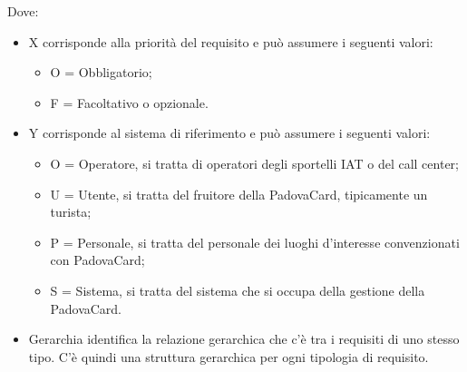 Dove:
\begin{itemize}
\item X corrisponde alla priorità del requisito e può assumere i seguenti valori:
	\begin{itemize}
		\item O = Obbligatorio;
        \item F = Facoltativo o opzionale.
	\end{itemize}
\item Y corrisponde al sistema di riferimento e può assumere i seguenti valori:
	\begin{itemize}
		\item O = Operatore, si tratta di operatori degli sportelli IAT o del call center;
        \item U = Utente, si tratta del fruitore della PadovaCard, tipicamente un turista;
        \item P = Personale, si tratta del personale dei luoghi d'interesse convenzionati con PadovaCard;
        \item S = Sistema, si tratta del sistema che si occupa della gestione della PadovaCard.
	\end{itemize}
\item Gerarchia identifica la relazione gerarchica che c'è tra i requisiti di uno stesso tipo. C'è quindi una struttura gerarchica per ogni tipologia di requisito.
\end{itemize}

\newpage


